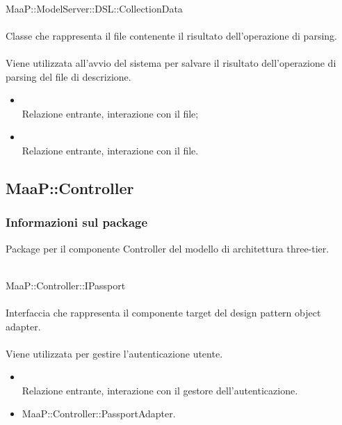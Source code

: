 	\\
	MaaP::ModelServer::DSL::CollectionData\\
	\\
	Classe che rappresenta il file contenente il risultato dell'operazione di parsing.\\
	\\
	Viene utilizzata all'avvio del sistema per salvare il risultato dell'operazione di parsing del file di descrizione.
	\begin{itemize}
	\item{}\\
	Relazione entrante, interazione con il file;
	\item{}\\
	Relazione entrante, interazione con il file.
	\end{itemize}
	

\subsection{MaaP::Controller}
\subsubsection{Informazioni sul package}
Package per il componente Controller del modello di architettura three-tier.

	\\
	MaaP::Controller::IPassport\\
	\\
	Interfaccia che rappresenta il componente target del design pattern object adapter.\\
	\\
	Viene utilizzata per gestire l'autenticazione utente.
	\begin{itemize}
	\item{}\\
	Relazione entrante, interazione con il gestore dell'autenticazione.
	\end{itemize}
	\begin{itemize}
	\item MaaP::Controller::PassportAdapter.
	\end{itemize}
	
